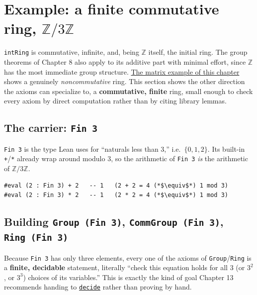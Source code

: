 \section{\texorpdfstring{Example: a finite commutative ring, \(\mathbb{Z}/3\mathbb{Z}\)}{Example: a finite commutative ring, \textbackslash mathbb\{Z\}/3\textbackslash mathbb\{Z\}}}\label{sec:09-rings:05-finite-ring-example:1}

\texttt{intRing} is commutative, infinite, and, being \(\mathbb{Z}\) itself, the initial ring. The group theorems of Chapter 8 also apply to its additive part with minimal effort, since \(\mathbb{Z}\) has the most immediate group structure. \hyperref[sec:09-rings:07-matrices:1]{The matrix example of this chapter} shows a genuinely \emph{noncommutative} ring. This section shows the other direction the axioms can specialize to, a \textbf{commutative, finite} ring, small enough to check every axiom by direct computation rather than by citing library lemmas.

\subsection{\texorpdfstring{The carrier: \texttt{Fin\ 3}}{The carrier: Fin 3}}\label{sec:09-rings:05-finite-ring-example:2}

\texttt{Fin 3} is the type Lean uses for ``naturals less than 3,'' i.e.~\(\{0, 1, 2\}\). Its built-in \texttt{+}/\texttt{*} already wrap around modulo 3, so the arithmetic of \texttt{Fin 3} \emph{is} the arithmetic of \(\mathbb{Z}/3\mathbb{Z}\).

\begin{lstlisting}
#eval (2 : Fin 3) + 2   -- 1   (2 + 2 = 4 (*$\equiv$*) 1 mod 3)
#eval (2 : Fin 3) * 2   -- 1   (2 * 2 = 4 (*$\equiv$*) 1 mod 3)
\end{lstlisting}

\subsection{\texorpdfstring{Building \texttt{Group\ (Fin\ 3)}, \texttt{CommGroup\ (Fin\ 3)}, \texttt{Ring\ (Fin\ 3)}}{Building Group (Fin 3), CommGroup (Fin 3), Ring (Fin 3)}}\label{sec:09-rings:05-finite-ring-example:3}

Because \texttt{Fin 3} has only three elements, every one of the axioms of \texttt{Group}/\texttt{Ring} is a \textbf{finite, decidable} statement, literally ``check this equation holds for all \(3\) (or \(3^2\), or \(3^3\)) choices of its variables.'' This is exactly the kind of goal Chapter 13 recommends handing to \href{https://lean-lang.org/doc/reference/latest/Tactic-Proofs/Tactic-Reference/}{\texttt{decide}} rather than proving by hand.


